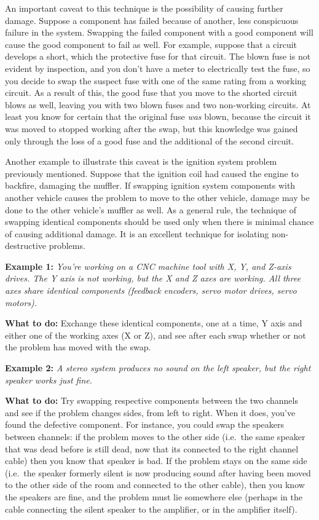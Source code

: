 An important caveat to this technique is the possibility of causing
further damage. Suppose a component has failed because of another, less
conspicuous failure in the system. Swapping the failed component with a
good component will cause the good component to fail as well. For
example, suppose that a circuit develops a short, which
 the protective fuse for that circuit. The blown fuse
is not evident by inspection, and you don't have a meter to electrically
test the fuse, so you decide to swap the suspect fuse with one of the
same rating from a working circuit. As a result of this, the good fuse
that you move to the shorted circuit blows as well, leaving you with two
blown fuses and two non-working circuits. At least you know for certain
that the original fuse {\em was} blown, because the circuit it was moved
to stopped working after the swap, but this knowledge was gained only
through the loss of a good fuse and the additional 
of the second circuit.

Another example to illustrate this caveat is the ignition system problem
previously mentioned. Suppose that the  ignition coil
had caused the engine to backfire, damaging the muffler. If swapping
ignition system components with another vehicle causes the problem to
move to the other vehicle, damage may be done to the other vehicle's
muffler as well. As a general rule, the technique of swapping identical
components should be used only when there is minimal chance of causing
additional damage. It is an excellent technique for isolating
non-destructive problems.

{\bf Example 1:} {\em You're working on a CNC machine tool with X, Y,
and Z-axis drives. The Y axis is not working, but the X and Z axes are
working. All three axes share identical components (feedback encoders,
servo motor drives, servo motors).}

{\bf What to do:} Exchange these identical components, one at a time, Y
axis and either one of the working axes (X or Z), and see after each
swap whether or not the problem has moved with the swap.

{\bf Example 2:} {\em A stereo system produces no sound on the left
speaker, but the right speaker works just fine.}

{\bf What to do:} Try swapping respective components between the two
channels and see if the problem changes sides, from left to right. When
it does, you've found the defective component. For instance, you could
swap the speakers between channels: if the problem moves to the other
side (i.e.~the same speaker that was dead before is still dead, now that
its connected to the right channel cable) then you know that speaker is
bad. If the problem stays on the same side (i.e.~the speaker formerly
silent is now producing sound after having been moved to the other side
of the room and connected to the other cable), then you know the
speakers are fine, and the problem must lie somewhere else (perhaps in
the cable connecting the silent speaker to the amplifier, or in the
amplifier itself).

